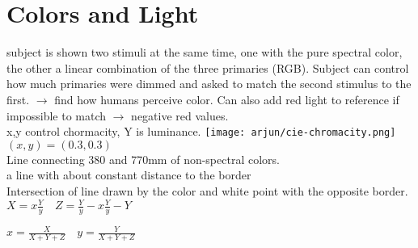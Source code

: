 \section{Colors and Light}
 subject is shown two stimuli at the same time, one with the pure spectral color, the other a linear combination of the three primaries (RGB). Subject can control how much primaries were dimmed and asked to match the second stimulus to the first. $\rightarrow$ find how humans perceive color. Can also add red light to reference if impossible to match $\rightarrow$ negative red values. \\
 x,y control chormacity, Y is luminance. 
    \texttt{[image: arjun/cie-chromacity.png]}
 $(x,y) = (0.3,0.3)$ \\
 Line connecting 380 and 770mm of non-spectral colors. \\
  a line with about constant distance to the border \\
 Intersection of line drawn by the color and white point with the opposite border. 
$X = x \frac{Y}{y} \quad Z = \frac{Y}{y} - x \frac{Y}{y} - Y$

$x = \frac{X}{X + Y + Z} \quad y = \frac{Y}{X + Y + Z}$

